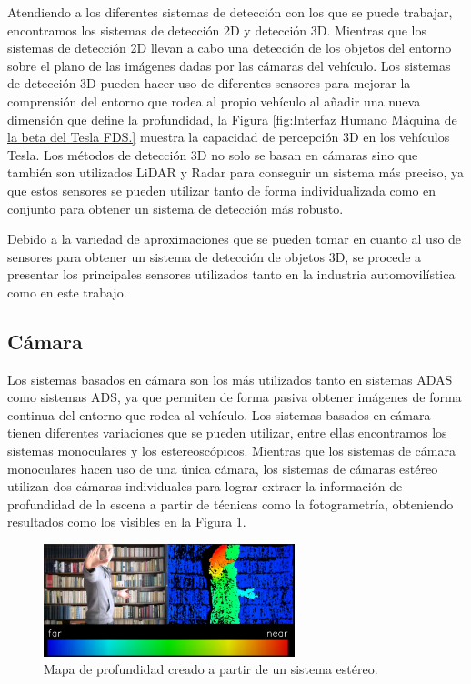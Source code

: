 Atendiendo a los diferentes sistemas de detección con los que se puede trabajar, encontramos los sistemas de detección 2D y detección 3D. Mientras que los sistemas de detección 2D llevan a cabo una detección de los objetos del entorno sobre el plano de las imágenes dadas por las cámaras del vehículo. Los sistemas de detección 3D pueden hacer uso de diferentes sensores para mejorar la comprensión del entorno que rodea al propio vehículo al añadir una nueva dimensión que define la profundidad, la Figura \ref{fig:Interfaz Humano Máquina de la beta del Tesla FDS.} muestra la capacidad de percepción 3D en los vehículos Tesla. Los métodos de detección 3D no solo se basan en cámaras sino que también son utilizados \ac{LiDAR} y \ac{Radar} para conseguir un sistema más preciso, ya que estos sensores se pueden utilizar tanto de forma individualizada como en conjunto para obtener un sistema de detección más robusto.

Debido a la variedad de aproximaciones que se pueden tomar en cuanto al uso de sensores para obtener un sistema de detección de objetos 3D, se procede a presentar los principales sensores utilizados tanto en la industria automovilística como en este trabajo.

\subsection{Cámara}
\label{sec:Cámara}

Los sistemas basados en cámara son los más utilizados tanto en sistemas \ac{ADAS} como sistemas \ac{ADS}, ya que permiten de forma pasiva obtener imágenes de forma continua del entorno que rodea al vehículo. Los sistemas basados en cámara tienen diferentes variaciones que se pueden utilizar, entre ellas encontramos los sistemas monoculares y los estereoscópicos. Mientras que los sistemas de cámara monoculares hacen uso de una única cámara, los sistemas de cámaras estéreo utilizan dos cámaras individuales para lograr extraer la información de profundidad de la escena a partir de técnicas como la fotogrametría, obteniendo resultados como los visibles en la Figura \ref{fig:Mapa de profundidad creado a partir de un sistema estéreo.}.

\begin{figure}[H]
    \centering
    \includegraphics[width=0.65\textwidth]{Book/figures/1_introduccion/stereo_system.png}
    \caption{Mapa de profundidad creado a partir de un sistema estéreo.}
    \label{fig:Mapa de profundidad creado a partir de un sistema estéreo.}
\end{figure}

